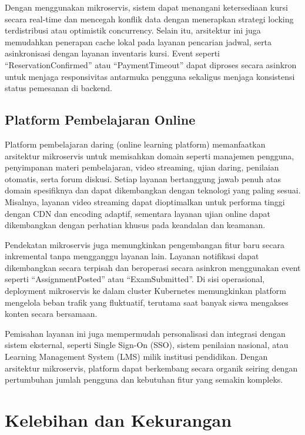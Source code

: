 Dengan menggunakan mikroservis, sistem dapat menangani ketersediaan kursi secara real-time dan mencegah konflik data dengan menerapkan strategi locking terdistribusi atau optimistik concurrency. Selain itu, arsitektur ini juga memudahkan penerapan cache lokal pada layanan pencarian jadwal, serta asinkronisasi dengan layanan inventaris kursi. Event seperti “ReservationConfirmed” atau “PaymentTimeout” dapat diproses secara asinkron untuk menjaga responsivitas antarmuka pengguna sekaligus menjaga konsistensi status pemesanan di backend.

\subsection{Platform Pembelajaran Online}

Platform pembelajaran daring (online learning platform) memanfaatkan arsitektur mikroservis untuk memisahkan domain seperti manajemen pengguna, penyimpanan materi pembelajaran, video streaming, ujian daring, penilaian otomatis, serta forum diskusi. Setiap layanan bertanggung jawab penuh atas domain spesifiknya dan dapat dikembangkan dengan teknologi yang paling sesuai. Misalnya, layanan video streaming dapat dioptimalkan untuk performa tinggi dengan CDN dan encoding adaptif, sementara layanan ujian online dapat dikembangkan dengan perhatian khusus pada keandalan dan keamanan.

Pendekatan mikroservis juga memungkinkan pengembangan fitur baru secara inkremental tanpa mengganggu layanan lain. Layanan notifikasi dapat dikembangkan secara terpisah dan beroperasi secara asinkron menggunakan event seperti “AssignmentPosted” atau “ExamSubmitted”. Di sisi operasional, deployment mikroservis ke dalam cluster Kubernetes memungkinkan platform mengelola beban trafik yang fluktuatif, terutama saat banyak siswa mengakses konten secara bersamaan.

Pemisahan layanan ini juga mempermudah personalisasi dan integrasi dengan sistem eksternal, seperti Single Sign-On (SSO), sistem penilaian nasional, atau Learning Management System (LMS) milik institusi pendidikan. Dengan arsitektur mikroservis, platform dapat berkembang secara organik seiring dengan pertumbuhan jumlah pengguna dan kebutuhan fitur yang semakin kompleks.


\section{Kelebihan dan Kekurangan}


